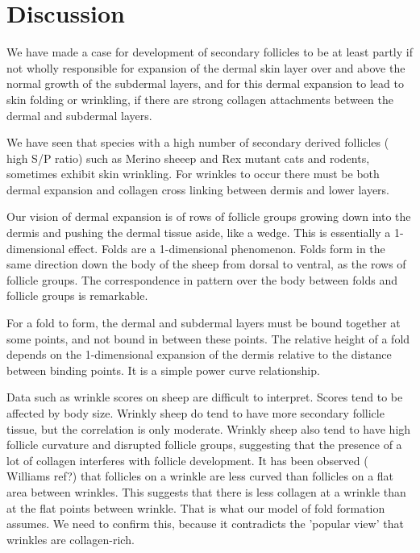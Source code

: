 \documentclass[titlepage]{article}  %
\begin{document}
\clearpage
\section{Discussion}
We have made a case for development of secondary follicles to be at least partly if not wholly responsible for expansion of the dermal skin layer over and above the normal growth of the subdermal layers, and for this dermal expansion to lead to skin folding or wrinkling, if there are strong collagen attachments between the dermal and subdermal layers.

We have seen that species with a high number of secondary derived follicles ( high S/P ratio) such as Merino sheeep and Rex mutant cats and rodents, sometimes exhibit skin wrinkling. For wrinkles to occur there must be both dermal expansion and collagen cross linking between dermis and lower layers.

 Our vision of dermal expansion is of rows of follicle groups growing down into the dermis and pushing the dermal tissue aside, like a wedge. This is essentially a 1-dimensional effect. Folds are a 1-dimensional phenomenon. Folds form in the same direction down the body of the sheep from dorsal to ventral, as the rows of follicle groups. The correspondence in pattern over the body between folds and follicle groups is remarkable.

For a fold to form, the dermal and subdermal layers must be bound together at some points, and not bound in between these points. The relative height of a fold depends on the 1-dimensional expansion of the dermis relative to the distance between binding points.  It is a simple power curve relationship.

Data such as wrinkle scores on sheep are difficult to interpret.  Scores tend to be affected by body size. Wrinkly sheep do tend to have more secondary follicle tissue, but the correlation is only moderate. Wrinkly sheep also tend to have high follicle curvature and disrupted follicle groups, suggesting that the presence of a lot of collagen interferes with follicle development. It has been observed ( Williams ref?)  that follicles on a wrinkle are less curved than follicles on a flat area between wrinkles. This suggests that there is less collagen at a wrinkle than at the flat points between wrinkle. That is what our model of fold formation assumes. We need to confirm this, because it contradicts the 'popular view' that wrinkles are collagen-rich.
\end{document}
